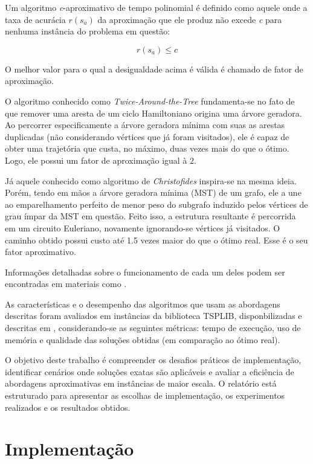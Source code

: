 \documentclass[12pt]{article}
\begin{document}
Um algoritmo \textit{c}-aproximativo de tempo polinomial é definido como aquele onde a taxa de acurácia $r(s_a)$ da aproximação que ele produz não excede \textit{c} para nenhuma instância do problema em questão:

$$ r(s_a) \leq c $$

O melhor valor para o qual a desigualdade acima é válida é chamado de fator de aproximação.

O algoritmo conhecido como \textit{Twice-Around-the-Tree} fundamenta-se no fato de que remover uma aresta de um ciclo Hamiltoniano origina uma árvore geradora. Ao percorrer especificamente a árvore geradora mínima com suas as arestas duplicadas (não considerando vértices que já foram visitados), ele é capaz de obter uma trajetória que custa, no máximo, duas vezes mais do que o ótimo. Logo, ele possui um fator de aproximação igual à $2$.  

Já aquele conhecido como algoritmo de \textit{Christofides} inspira-se na mesma ideia. Porém, tendo em mãos a árvore geradora mínima (MST) de um grafo, ele a une ao emparelhamento perfeito de menor peso do subgrafo induzido pelos vértices de grau ímpar da MST em questão. Feito isso, a estrutura resultante é percorrida em um circuito Euleriano, novamente ignorando-se vértices já visitados. O caminho obtido possui custo até 1.5 vezes maior do que o ótimo real. Esse é o seu fator aproximativo. 

Informações detalhadas sobre o funcionamento de cada um deles podem ser encontradas em materiais como \cite{levitin}.

As características e o desempenho das algoritmos que usam as abordagens descritas foram avaliados em instâncias da biblioteca TSPLIB, disponbilizadas e descritas em \cite{tsp_instances_desc}, considerando-se as seguintes métricas: tempo de execução, uso de memória e qualidade das soluções obtidas (em comparação ao ótimo real).

O objetivo deste trabalho é compreender os desafios práticos de implementação, identificar cenários onde soluções exatas são aplicáveis e avaliar a eficiência de abordagens aproximativas em instâncias de maior escala. O relatório está estruturado para apresentar as escolhas de implementação, os experimentos realizados e os resultados obtidos.

\section{Implementação}
\end{document}

